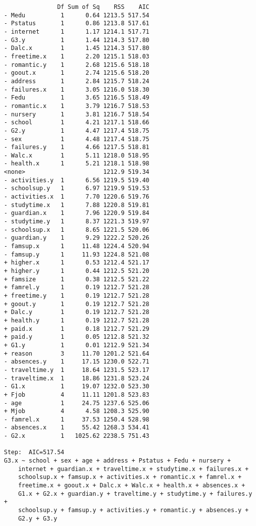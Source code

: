 \documentclass[11pt]{article}
\begin{document}
\begin{enumerate}
\begin{verbatim}
               Df Sum of Sq    RSS    AIC
- Medu          1      0.64 1213.5 517.54
- Pstatus       1      0.86 1213.8 517.61
- internet      1      1.17 1214.1 517.71
- G3.y          1      1.44 1214.3 517.80
- Dalc.x        1      1.45 1214.3 517.80
- freetime.x    1      2.20 1215.1 518.03
- romantic.y    1      2.68 1215.6 518.18
- goout.x       1      2.74 1215.6 518.20
- address       1      2.84 1215.7 518.24
- failures.x    1      3.05 1216.0 518.30
- Fedu          1      3.65 1216.5 518.49
- romantic.x    1      3.79 1216.7 518.53
- nursery       1      3.81 1216.7 518.54
- school        1      4.21 1217.1 518.66
- G2.y          1      4.47 1217.4 518.75
- sex           1      4.48 1217.4 518.75
- failures.y    1      4.66 1217.5 518.81
- Walc.x        1      5.11 1218.0 518.95
- health.x      1      5.21 1218.1 518.98
<none>                      1212.9 519.34
- activities.y  1      6.56 1219.5 519.40
- schoolsup.y   1      6.97 1219.9 519.53
- activities.x  1      7.70 1220.6 519.76
- studytime.x   1      7.88 1220.8 519.81
- guardian.x    1      7.96 1220.9 519.84
- studytime.y   1      8.37 1221.3 519.97
- schoolsup.x   1      8.65 1221.5 520.06
- guardian.y    1      9.29 1222.2 520.26
- famsup.x      1     11.48 1224.4 520.94
- famsup.y      1     11.93 1224.8 521.08
+ higher.x      1      0.53 1212.4 521.17
+ higher.y      1      0.44 1212.5 521.20
+ famsize       1      0.38 1212.5 521.22
+ famrel.y      1      0.19 1212.7 521.28
+ freetime.y    1      0.19 1212.7 521.28
+ goout.y       1      0.19 1212.7 521.28
+ Dalc.y        1      0.19 1212.7 521.28
+ health.y      1      0.19 1212.7 521.28
+ paid.x        1      0.18 1212.7 521.29
+ paid.y        1      0.05 1212.8 521.32
+ G1.y          1      0.01 1212.9 521.34
+ reason        3     11.70 1201.2 521.64
- absences.y    1     17.15 1230.0 522.71
- traveltime.y  1     18.64 1231.5 523.17
- traveltime.x  1     18.86 1231.8 523.24
- G1.x          1     19.07 1232.0 523.30
+ Fjob          4     11.11 1201.8 523.83
- age           1     24.75 1237.6 525.06
+ Mjob          4      4.58 1208.3 525.90
- famrel.x      1     37.53 1250.4 528.98
- absences.x    1     55.42 1268.3 534.41
- G2.x          1   1025.62 2238.5 751.43

Step:  AIC=517.54
G3.x ~ school + sex + age + address + Pstatus + Fedu + nursery + 
    internet + guardian.x + traveltime.x + studytime.x + failures.x + 
    schoolsup.x + famsup.x + activities.x + romantic.x + famrel.x + 
    freetime.x + goout.x + Dalc.x + Walc.x + health.x + absences.x + 
    G1.x + G2.x + guardian.y + traveltime.y + studytime.y + failures.y + 
    schoolsup.y + famsup.y + activities.y + romantic.y + absences.y + 
    G2.y + G3.y


\end{verbatim}
\end{enumerate}
\end{document}
